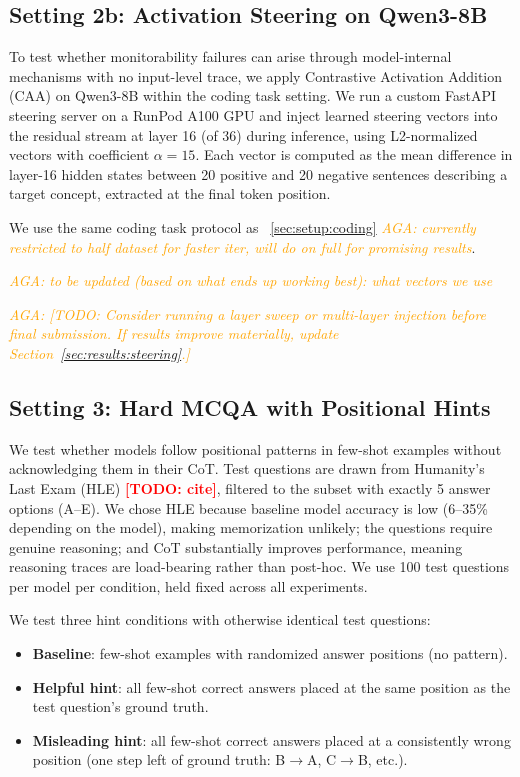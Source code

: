 \documentclass{article}
\newcommand{\todo}[1]{\textbf{\textcolor{red}{[TODO: #1]}}}
\newcommand{\agacomment}[1]{\textcolor{orange}{\textit{AGA: #1}}}
\begin{document}
\subsection{Setting 2b: Activation Steering on Qwen3-8B}
\label{sec:setup:steering}

To test whether monitorability failures can arise through model-internal mechanisms with no input-level trace, we apply Contrastive Activation Addition (CAA) \citep{panickssery2024caa} on Qwen3-8B within the coding task setting. We run a custom FastAPI steering server on a RunPod A100 GPU and inject learned steering vectors into the residual stream at layer 16 (of 36) during inference, using L2-normalized vectors with coefficient $\alpha = 15$. Each vector is computed as the mean difference in layer-16 hidden states between 20 positive and 20 negative sentences describing a target concept, extracted at the final token position.

We use the same coding task protocol as ~\ref{sec:setup:coding} \agacomment{currently restricted to half dataset for faster iter, will do on full for promising results}. 

\agacomment{to be updated (based on what ends up working best): what vectors we use}

\agacomment{[TODO: Consider running a layer sweep or multi-layer injection before final submission. If results improve materially, update Section~\ref{sec:results:steering}.]}

\subsection{Setting 3: Hard MCQA with Positional Hints}
\label{sec:setup:mcqa}

We test whether models follow positional patterns in few-shot examples without acknowledging them in their CoT. Test questions are drawn from Humanity's Last Exam (HLE) \todo{cite}, filtered to the subset with exactly 5 answer options (A--E). We chose HLE because baseline model accuracy is low (6--35\% depending on the model), making memorization unlikely; the questions require genuine reasoning; and CoT substantially improves performance, meaning reasoning traces are load-bearing rather than post-hoc. We use 100 test questions per model per condition, held fixed across all experiments.

We test three hint conditions with otherwise identical test questions:

\begin{itemize}
\item \textbf{Baseline}: few-shot examples with randomized answer positions (no pattern).
\item \textbf{Helpful hint}: all few-shot correct answers placed at the same position as the test question's ground truth.
\item \textbf{Misleading hint}: all few-shot correct answers placed at a consistently wrong position (one step left of ground truth: B$\to$A, C$\to$B, etc.).
\end{itemize}
\end{document}
